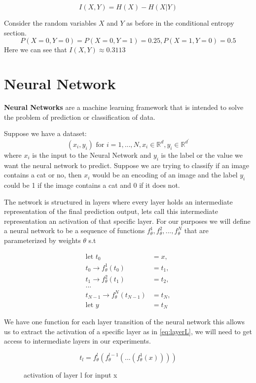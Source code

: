 \begin{equation}
  I(X, Y) = H(X) - H(X|Y)
\label{eq:miEntropy}
\end{equation}

Consider the random variables $X$ and $Y$ as before in the conditional entropy
section. 
$$P(X=0,Y=0) = P(X=0,Y=1) = 0.25, P(X=1,Y=0) = 0.5$$
Here we can see that $I(X,Y) \approx 0.3113$

\section{Neural Network}

\textbf{Neural Networks} are a machine learning framework that is intended to
solve the problem of prediction or classification of data. 

Suppose we have a dataset:
$$ (x_i, y_i) \text{ for } i = 1,...,N, x_i \in \mathbb{R}^d, y_i \in \mathbb{R}^{d^\prime}$$ 
where $x_i$ is the input to the Neural Network and $y_i$ is the label or the
value we want the neural network to predict. Suppose we are trying to classify
if an image contains a cat or no, then $x_i$ would be an encoding of an image
and the label $y_i$ could be 1 if the image contains a cat and 0 if it does not.

The network is structured in layers where every layer holds an intermediate
representation of the final prediction output, lets call this intermediate
representation an activation of that specific layer. For our purposes we will
define a neural network to be a sequence of functions
$f_{\theta}^1,f_{\theta}^2,... ,f_{\theta}^N$ that are parameterized by weights
$\theta$ s.t

\begin{align*}
  \text{let } t_0 &= x, \\
    t_0 \rightarrow f_{\theta}^1(t_0) &= t_1,\\
    t_1 \rightarrow f_{\theta}^2(t_1) &= t_2,\\
    ...\\
    t_{N-1} \rightarrow f_{\theta}^N(t_{N-1}) &= t_N,\\
    \text{let } y &= t_N
\end{align*}

We have one function for each layer transition of the neural network this allows
us to extract the activation of a specific layer as in \autoref{eq:layerL}, we
will need to get access to intermediate layers in our experiments.

\begin{figure}[H]
  \[ t_l = f_{\theta}^l(f_{\theta}^{l-1}(...(f_{\theta}^1(x)))) \]
  \caption{activation of layer l for input x}
  \label{eq:layerL}
\end{figure}

